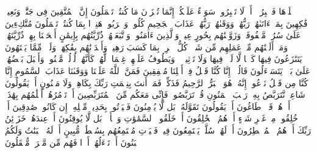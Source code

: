 \startbuffer[\q:52:16]
ٱصۡلَوۡهَا فَٱصۡبِرُوۤا۟ أَوۡ لَا تَصۡبِرُوا۟ سَوَاۤءٌ عَلَیۡكُمۡۖ إِنَّمَا تُجۡزَوۡنَ مَا كُنتُمۡ تَعۡمَلُونَ%
\stopbuffer%
\startbuffer[\q:52:17]
إِنَّ ٱلۡمُتَّقِینَ فِی جَنَّٰتࣲ وَنَعِیمࣲ%
\stopbuffer%
\startbuffer[\q:52:18]
فَٰكِهِینَ بِمَاۤ ءَاتَىٰهُمۡ رَبُّهُمۡ وَوَقَىٰهُمۡ رَبُّهُمۡ عَذَابَ ٱلۡجَحِیمِ%
\stopbuffer%
\startbuffer[\q:52:19]
كُلُوا۟ وَٱشۡرَبُوا۟ هَنِیۤءَۢا بِمَا كُنتُمۡ تَعۡمَلُونَ%
\stopbuffer%
\startbuffer[\q:52:20]
مُتَّكِءِینَ عَلَىٰ سُرُرࣲ مَّصۡفُوفَةࣲۖ وَزَوَّجۡنَٰهُم بِحُورٍ عِینࣲ%
\stopbuffer%
\startbuffer[\q:52:21]
وَٱلَّذِینَ ءَامَنُوا۟ وَٱتَّبَعَتۡهُمۡ ذُرِّیَّتُهُم بِإِیمَٰنٍ أَلۡحَقۡنَا بِهِمۡ ذُرِّیَّتَهُمۡ وَمَاۤ أَلَتۡنَٰهُم مِّنۡ عَمَلِهِم مِّن شَیۡءࣲۚ كُلُّ ٱمۡرِئِۭ بِمَا كَسَبَ رَهِینࣱ%
\stopbuffer%
\startbuffer[\q:52:22]
وَأَمۡدَدۡنَٰهُم بِفَٰكِهَةࣲ وَلَحۡمࣲ مِّمَّا یَشۡتَهُونَ%
\stopbuffer%
\startbuffer[\q:52:23]
یَتَنَٰزَعُونَ فِیهَا كَأۡسࣰا لَّا لَغۡوࣱ فِیهَا وَلَا تَأۡثِیمࣱ%
\stopbuffer%
\startbuffer[\q:52:24]
۞ وَیَطُوفُ عَلَیۡهِمۡ غِلۡمَانࣱ لَّهُمۡ كَأَنَّهُمۡ لُؤۡلُؤࣱ مَّكۡنُونࣱ%
\stopbuffer%
\startbuffer[\q:52:25]
وَأَقۡبَلَ بَعۡضُهُمۡ عَلَىٰ بَعۡضࣲ یَتَسَاۤءَلُونَ%
\stopbuffer%
\startbuffer[\q:52:26]
قَالُوۤا۟ إِنَّا كُنَّا قَبۡلُ فِیۤ أَهۡلِنَا مُشۡفِقِینَ%
\stopbuffer%
\startbuffer[\q:52:27]
فَمَنَّ ٱللَّهُ عَلَیۡنَا وَوَقَىٰنَا عَذَابَ ٱلسَّمُومِ%
\stopbuffer%
\startbuffer[\q:52:28]
إِنَّا كُنَّا مِن قَبۡلُ نَدۡعُوهُۖ إِنَّهُۥ هُوَ ٱلۡبَرُّ ٱلرَّحِیمُ%
\stopbuffer%
\startbuffer[\q:52:29]
فَذَكِّرۡ فَمَاۤ أَنتَ بِنِعۡمَتِ رَبِّكَ بِكَاهِنࣲ وَلَا مَجۡنُونٍ%
\stopbuffer%
\startbuffer[\q:52:30]
أَمۡ یَقُولُونَ شَاعِرࣱ نَّتَرَبَّصُ بِهِۦ رَیۡبَ ٱلۡمَنُونِ%
\stopbuffer%
\startbuffer[\q:52:31]
قُلۡ تَرَبَّصُوا۟ فَإِنِّی مَعَكُم مِّنَ ٱلۡمُتَرَبِّصِینَ%
\stopbuffer%
\startbuffer[\q:52:32]
أَمۡ تَأۡمُرُهُمۡ أَحۡلَٰمُهُم بِهَٰذَاۤۚ أَمۡ هُمۡ قَوۡمࣱ طَاغُونَ%
\stopbuffer%
\startbuffer[\q:52:33]
أَمۡ یَقُولُونَ تَقَوَّلَهُۥۚ بَل لَّا یُؤۡمِنُونَ%
\stopbuffer%
\startbuffer[\q:52:34]
فَلۡیَأۡتُوا۟ بِحَدِیثࣲ مِّثۡلِهِۦۤ إِن كَانُوا۟ صَٰدِقِینَ%
\stopbuffer%
\startbuffer[\q:52:35]
أَمۡ خُلِقُوا۟ مِنۡ غَیۡرِ شَیۡءٍ أَمۡ هُمُ ٱلۡخَٰلِقُونَ%
\stopbuffer%
\startbuffer[\q:52:36]
أَمۡ خَلَقُوا۟ ٱلسَّمَٰوَٰتِ وَٱلۡأَرۡضَۚ بَل لَّا یُوقِنُونَ%
\stopbuffer%
\startbuffer[\q:52:37]
أَمۡ عِندَهُمۡ خَزَاۤئِنُ رَبِّكَ أَمۡ هُمُ ٱلۡمُصَۣیۡطِرُونَ%
\stopbuffer%
\startbuffer[\q:52:38]
أَمۡ لَهُمۡ سُلَّمࣱ یَسۡتَمِعُونَ فِیهِۖ فَلۡیَأۡتِ مُسۡتَمِعُهُم بِسُلۡطَٰنࣲ مُّبِینٍ%
\stopbuffer%
\startbuffer[\q:52:39]
أَمۡ لَهُ ٱلۡبَنَٰتُ وَلَكُمُ ٱلۡبَنُونَ%
\stopbuffer%
\startbuffer[\q:52:40]
أَمۡ تَسۡءَلُهُمۡ أَجۡرࣰا فَهُم مِّن مَّغۡرَمࣲ مُّثۡقَلُونَ%
